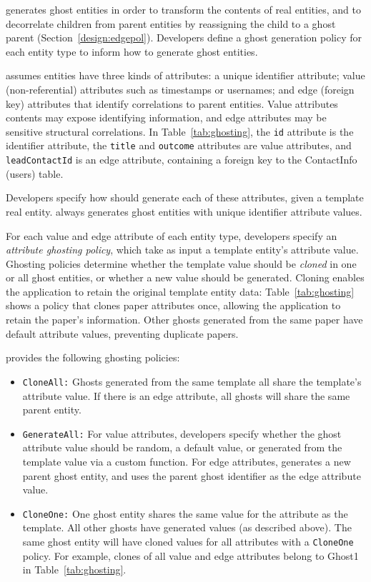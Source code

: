 \sys generates ghost entities in order to transform the contents of real entities, and to
decorrelate children from parent entities by reassigning the child to a ghost parent
(Section~\ref{design:edgepol}). Developers define a ghost generation policy for each entity type to
inform \sys how to generate ghost entities.

\sys assumes entities have three kinds of attributes: a unique identifier attribute; value
(non-referential) attributes such as timestamps or usernames; and edge (foreign key)
attributes that identify correlations to parent entities.  Value attributes contents may expose
identifying information, and edge attributes may be sensitive structural correlations.
In Table~\ref{tab:ghosting}, the \texttt{id} attribute is the identifier attribute, the
\texttt{title} and \texttt{outcome} attributes are value attributes, and \texttt{leadContactId} is
an edge attribute, containing a foreign key to the ContactInfo (users) table. 

Developers specify how \sys should generate each of these attributes, given a template real
entity.
\sys always generates ghost entities with unique identifier attribute values.

For each value and edge attribute of each entity type, developers specify an \emph{attribute ghosting policy},
which take as input a template entity's attribute value. Ghosting policies determine whether the
template value should be \emph{cloned} in one or all ghost entities, or whether
a new value should be generated. Cloning enables the application to retain
the original template entity data: Table~\ref{tab:ghosting} shows a policy that clones
paper attributes once, allowing the application to retain the paper's information. Other ghosts
generated from the same paper have default attribute values, preventing duplicate papers.

\sys provides the following ghosting policies:
\begin{itemize}
    \item \texttt{CloneAll:} Ghosts generated from the same template all share the template's 
        attribute value. If there is an edge attribute, all ghosts will share the
        same parent entity.

    \item \texttt{GenerateAll:} 
        For value attributes, developers specify whether the ghost attribute value should be
        random, a default value, or generated from the template value via a custom function.
        For edge attributes, \sys generates a new parent ghost entity, and uses the parent ghost
        identifier as the edge attribute value.

    \item \texttt{CloneOne:} One ghost entity shares the same value for the attribute as the
        template. All other ghosts have generated values (as described above).
        The same ghost entity will have cloned values for all attributes with a
        \texttt{CloneOne} policy. For example, clones of all value and edge attributes belong to
        Ghost1 in Table~\ref{tab:ghosting}.
\end{itemize}


